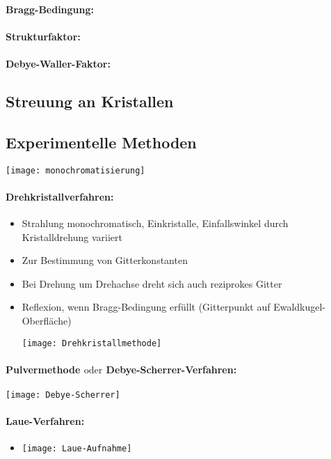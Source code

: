 \documentclass[a4paper,12pt]{article}
\begin{document}
\paragraph*{Bragg-Bedingung:}
\paragraph*{Strukturfaktor:}
\paragraph*{Debye-Waller-Faktor:}

\subsection{Streuung an Kristallen}
\subsection{Experimentelle Methoden}
\texttt{[image: monochromatisierung]}
\paragraph*{Drehkristallverfahren:} \begin{itemize}
		\item Strahlung monochromatisch, Einkristalle, Einfallswinkel durch Kristalldrehung variiert
		\item Zur Bestimmung von Gitterkonstanten
		\item Bei Drehung um Drehachse dreht sich auch reziprokes Gitter
		\item Reflexion, wenn Bragg-Bedingung erfüllt (Gitterpunkt auf Ewaldkugel-Oberfläche)  \begin{center}
		\texttt{[image: Drehkristallmethode]}
	\end{center}
	\end{itemize}
\paragraph*{Pulvermethode $ \mathrm{oder} $ Debye-Scherrer-Verfahren:}
\texttt{[image: Debye-Scherrer]}
\paragraph*{Laue-Verfahren:}
\begin{itemize}
	\item \begin{center}
		\texttt{[image: Laue-Aufnahme]}
	\end{center} 
\end{itemize}
\end{document}
